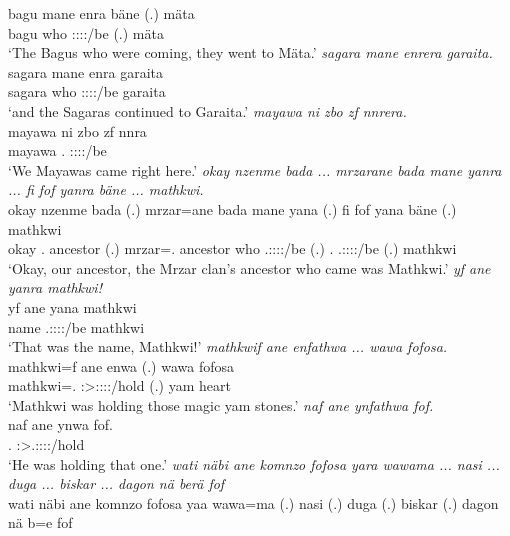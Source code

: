 \begin{exe}
	\gll bagu mane enra bäne (.) mäta\\ 
	bagu who \Stpl:\Sbj:\Pst:\Ipfv:\Venit/be \Recog{} (.) mäta\\
	\trans `The Bagus who were coming, they went to Mäta.'
	\emph{sagara mane enrera garaita.}\\
	\gll sagara mane enra garaita\\ 
	sagara who \Stpl:\Sbj:\Pst:\Ipfv:\Venit/be garaita\\
	\trans `and the Sagaras continued to Garaita.'
	\emph{mayawa ni zbo zf nnrera.}\\
	\gll mayawa ni zbo zf nnra\\ 
	mayawa \Fnsg{} \Prox.\All{} \Imm{} \Fpl:\Sbj:\Pst:\Ipfv:\Venit/be\\
	\trans `We Mayawas came right here.'
	\emph{okay nzenme bada ... mrzarane bada mane yanra ... fi fof yanra bäne ... mathkwi.}\\
	\gll okay nzenme bada (.) mrzar=ane bada mane yana (.) fi fof yana bäne (.) mathkwi\\ 
	okay \Fnsg.\Poss{} ancestor (.) mrzar=\Poss.\Sg{} ancestor who \Tsg.\Masc:\Sbj:\Pst:\Ipfv:\Venit/be (.) \Third.\Abs{} \Emph{} \Tsg.\Masc:\Sbj:\Pst:\Ipfv:\Venit/be \Recog{} (.) mathkwi\\
	\trans `Okay, our ancestor, the Mrzar clan's ancestor who came was Mathkwi.'
	\emph{yf ane yanra mathkwi!}\\
	\gll yf ane yana mathkwi\\ 
	name \Dem{} \Tsg.\Masc:\Sbj:\Pst:\Ipfv:\Venit/be mathkwi\\
	\trans `That was the name, Mathkwi!'
	\emph{mathkwif ane enfathwa ... wawa fofosa.}\\
	\gll mathkwi=f ane enwa (.) wawa fofosa\\ 
	mathkwi=\Erg.\Sg{} \Dem{} \Sg:\Sbj>\Stpl:\Obj:\Pst:\Ipfv:\Venit/hold (.) yam heart\\
	\trans `Mathkwi was holding those magic yam stones.'
	\emph{naf ane ynfathwa fof.}\\
	\gll naf ane ynwa fof.\\ 
	\Tsg.\Erg{} \Dem{} \Sg:\Sbj>\Tsg.\Masc:\Obj:\Pst:\Ipfv:\Venit/hold \Emph\\
	\trans `He was holding that one.'
	\emph{wati näbi ane komnzo fofosa yara wawama ... nasi ... duga ... biskar ... dagon nä berä fof}\\
	\gll wati näbi ane komnzo fofosa yaa wawa=ma (.) nasi (.) duga (.) biskar (.) dagon nä b=e fof\\ 

\end{exe}
